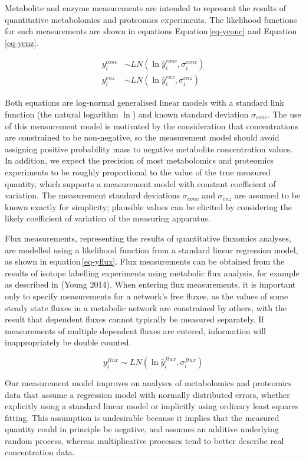 \documentclass[journal=,manuscript=]{achemso}
\begin{document}
Metabolite and enzyme measurements are intended to represent the results
of quantitative metabolomics and proteomics experiments. The likelihood
functions for such measurements are shown in equations
Equation\,\eqref{eq-yconc} and Equation\,\eqref{eq-yenz}.

\begin{align}
y_i^{conc} &\sim LN(\ln{\hat{y}_i^{conc}}, \sigma_i^{conc})\label{eq-yconc} \\
y_i^{enz} &\sim LN(\ln{\hat{y}_i^{enz}}, \sigma_i^{enz})\label{eq-yenz}
\end{align}

Both equations are log-normal generalised linear models with a standard
link function (the natural logarithm \(\ln\)) and known standard
deviation \(\sigma_{𝑐𝑜𝑛𝑐}\). The use of this measurement model is
motivated by the consideration that concentrations are constrained to be
non-negative, so the measurement model should avoid assigning positive
probability mass to negative metabolite concentration values. In
addition, we expect the precision of most metabolomics and proteomics
experiments to be roughly proportional to the value of the true measured
quantity, which supports a measurement model with constant coefficient
of variation. The measurement standard deviations \(\sigma_{𝑐𝑜𝑛𝑐}\) and
\(\sigma_{𝑒𝑛𝑧}\) are assumed to be known exactly for simplicity;
plausible values can be elicited by considering the likely coefficient
of variation of the measuring apparatus.

Flux measurements, representing the results of quantitative fluxomics
analyses, are modelled using a likelihood function from a standard
linear regression model, as shown in equation\,\eqref{eq-yflux}. Flux
measurements can be obtained from the results of isotope labelling
experiments using metabolic flux analysis, for example as described in
(Young 2014). When entering flux measurements, it is important only to
specify measurements for a network's free fluxes, as the values of some
steady state fluxes in a metabolic network are constrained by others,
with the result that dependent fluxes cannot typically be measured
separately. If measurements of multiple dependent fluxes are entered,
information will inappropriately be double counted.

\begin{equation}
y_i^{flux} \sim LN(\ln{\hat{y}_i^{flux}}, \sigma_i^{flux})\label{eq-yflux}
\end{equation}

Our measurement model improves on analyses of metabolomics and
proteomics data that assume a regression model with normally distributed
errors, whether explicitly using a standard linear model or implicitly
using ordinary least squares fitting. This assumption is undesirable
because it implies that the measured quantity could in principle be
negative, and assumes an additive underlying random process, whereas
multiplicative processes tend to better describe real concentration
data.
\end{document}
